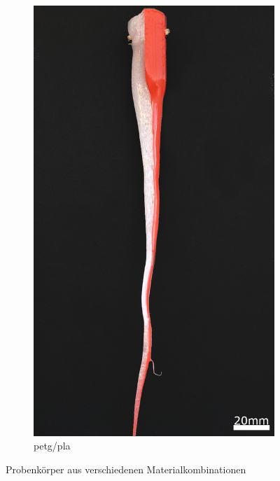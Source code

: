 \begin{figure}[!h]
     \begin{subfigure}[]{.29\textwidth}
        \centering
        \includegraphics[width=\textwidth]{Abbildungen/Versuche/probe4_w.jpg}
         \caption{\acs{petg}/\acs{pla} }
        \label{fig:probe4}
     \end{subfigure}
     \caption{Probenkörper aus verschiedenen Materialkombinationen}
      \label{fig:probenkoerper_vor}
        \end{figure}

